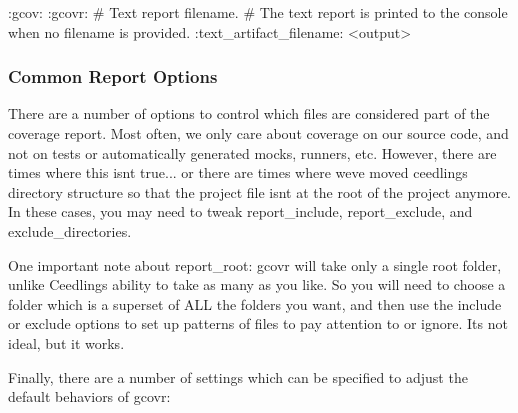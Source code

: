 \begin{DoxyCode}
:gcov:
  :gcovr:
    # Text report filename.
    # The text report is printed to the console when no filename is provided.
    :text\_artifact\_filename: <output>
\end{DoxyCode}


\subsubsection*{Common Report Options}

There are a number of options to control which files are considered part of the coverage report. Most often, we only care about coverage on our source code, and not on tests or automatically generated mocks, runners, etc. However, there are times where this isn\textquotesingle{}t true... or there are times where we\textquotesingle{}ve moved ceedling\textquotesingle{}s directory structure so that the project file isn\textquotesingle{}t at the root of the project anymore. In these cases, you may need to tweak {\ttfamily report\+\_\+include}, {\ttfamily report\+\_\+exclude}, and {\ttfamily exclude\+\_\+directories}.

One important note about {\ttfamily report\+\_\+root}\+: gcovr will take only a single root folder, unlike Ceedling\textquotesingle{}s ability to take as many as you like. So you will need to choose a folder which is a superset of A\+LL the folders you want, and then use the include or exclude options to set up patterns of files to pay attention to or ignore. It\textquotesingle{}s not ideal, but it works.

Finally, there are a number of settings which can be specified to adjust the default behaviors of gcovr\+:



